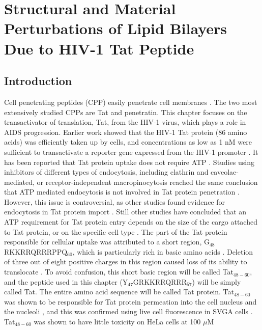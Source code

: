 \chapter{Structural and Material Perturbations of Lipid Bilayers Due to HIV-1 Tat Peptide}
\section{Introduction}\label{sec:Tat_intro}
Cell penetrating peptides (CPP) easily penetrate cell membranes 
\cite{Fischer05,Joliot04,Lindgren00}. 
The two most extensively studied CPPs are Tat and penetratin.
This chapter focuses on 
the transactivator of translation, Tat, from the HIV-1 virus, which plays a 
role in AIDS progression. 
Earlier work showed that the HIV-1 Tat 
protein (86 amino acids) was efficiently taken up by cells, and concentrations 
as low as 1 nM were sufficient to transactivate a reporter gene expressed from 
the HIV-1 promoter \cite{Frankel88,Green88}. 
It has been reported that Tat protein uptake does not 
require ATP \cite{Vives97}. 
Studies using inhibitors of different types of endocytosis, 
including clathrin and caveolae-mediated, or receptor-independent 
macropinocytosis reached the same conclusion that ATP mediated endocytosis is 
not involved in Tat protein penetration
\cite{TerAvetisyan09,Duchardt07,Tunnemann06,Ziegler05}. 
However, this issue is 
controversial, as other studies found evidence for endocytosis in Tat protein 
import \cite{Wadia04,Kaplan05,Mann91,Richard05,Jones05,Vendeville04,Foerg05,Fittipaldi05,Liu00}. 
Still other studies have concluded that an ATP requirement for 
Tat protein entry depends on the size of the cargo attached to Tat protein, or 
on the specific cell type \cite{Torchilin01,Torchilin03,Rudolph03}. 
The part of the Tat protein responsible for 
cellular uptake was attributed to a short region, G$_{48}$RKKRRQRRRPPQ$_{60}$, 
which is particularly rich in basic amino acids \cite{Vives97}. 
Deletion of three out of 
eight positive charges in this region
caused loss of its ability to translocate \cite{Vives97}. 
To avoid confusion, this short basic region will be called Tat$_{48-60}$,
and the peptide used in this chapter (Y$_{47}$GRKKRRQRRR$_{57}$)
will be simply called Tat. The entire amino acid sequence will
be called Tat protein.
Tat$_{48-60}$ was shown to be responsible for Tat
protein permeation into the cell nucleus and the nucleoli \cite{Vives97}, 
and this was confirmed using live cell fluorescence in SVGA cells \cite{Chauhan07}. 
Tat$_{48-60}$ was shown to have little toxicity on HeLa cells at 100 $\mu$M 
